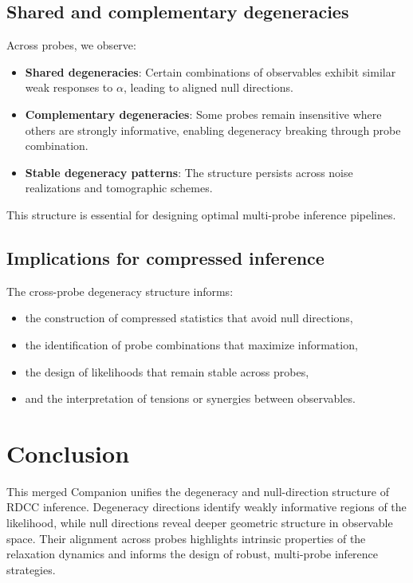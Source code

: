\documentclass[11pt,a4paper]{article}
\begin{document}
\subsection{Shared and complementary degeneracies}

Across probes, we observe:
\begin{itemize}
    \item \textbf{Shared degeneracies}:  
    Certain combinations of observables exhibit similar weak responses to 
    $\alpha$, leading to aligned null directions.

    \item \textbf{Complementary degeneracies}:  
    Some probes remain insensitive where others are strongly informative, 
    enabling degeneracy breaking through probe combination.

    \item \textbf{Stable degeneracy patterns}:  
    The structure persists across noise realizations and tomographic schemes.
\end{itemize}

This structure is essential for designing optimal multi-probe inference 
pipelines.

\subsection{Implications for compressed inference}

The cross-probe degeneracy structure informs:
\begin{itemize}
    \item the construction of compressed statistics that avoid null directions,
    \item the identification of probe combinations that maximize information,
    \item the design of likelihoods that remain stable across probes,
    \item and the interpretation of tensions or synergies between observables.
\end{itemize}

\section{Conclusion}

This merged Companion unifies the degeneracy and null-direction structure of 
RDCC inference. Degeneracy directions identify weakly informative regions of 
the likelihood, while null directions reveal deeper geometric structure in 
observable space. Their alignment across probes highlights intrinsic properties 
of the relaxation dynamics and informs the design of robust, multi-probe 
inference strategies.
\end{document}
